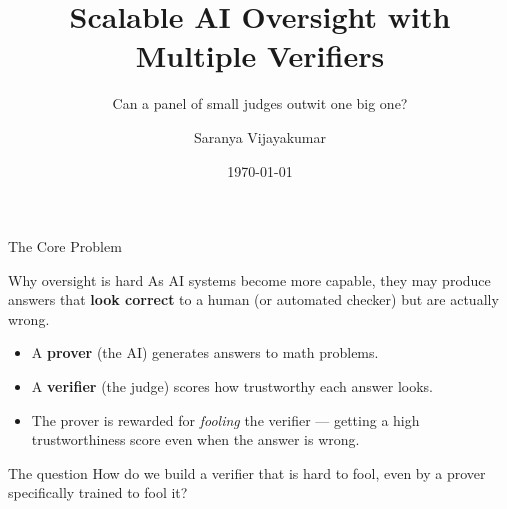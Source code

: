 \documentclass[aspectratio=169]{beamer}
\title[Multi-Verifier Oversight]{Scalable AI Oversight with\\Multiple Verifiers}
\subtitle{Can a panel of small judges outwit one big one?}
\author{Saranya Vijayakumar}
\date{\today}
\begin{document}
\begin{frame}
  \titlepage
\end{frame}

\begin{frame}{The Core Problem}

  \begin{block}{Why oversight is hard}
    As AI systems become more capable, they may produce answers that
    \textbf{look correct} to a human (or automated checker) but are actually wrong.
  \end{block}

  \vspace{0.5em}
  \begin{itemize}
    \item A \textbf{prover} (the AI) generates answers to math problems.
    \item A \textbf{verifier} (the judge) scores how trustworthy each answer looks.
    \item The prover is rewarded for \emph{fooling} the verifier --- getting a high
          trustworthiness score even when the answer is wrong.
  \end{itemize}

  \vspace{0.5em}
  \begin{alertblock}{The question}
    How do we build a verifier that is hard to fool, even by a prover
    specifically trained to fool it?
  \end{alertblock}

\end{frame}
\end{document}
